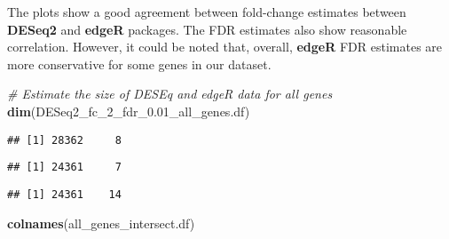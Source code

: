 \documentclass[]{book}
\newenvironment{Shaded}{\begin{snugshade}}{\end{snugshade}}
\newcommand{\KeywordTok}[1]{\textcolor[rgb]{0.13,0.29,0.53}{\textbf{#1}}}
\newcommand{\DataTypeTok}[1]{\textcolor[rgb]{0.13,0.29,0.53}{#1}}
\newcommand{\FloatTok}[1]{\textcolor[rgb]{0.00,0.00,0.81}{#1}}
\newcommand{\StringTok}[1]{\textcolor[rgb]{0.31,0.60,0.02}{#1}}
\newcommand{\CommentTok}[1]{\textcolor[rgb]{0.56,0.35,0.01}{\textit{#1}}}
\newcommand{\OperatorTok}[1]{\textcolor[rgb]{0.81,0.36,0.00}{\textbf{#1}}}
\newcommand{\NormalTok}[1]{#1}
\begin{document}
The plots show a good agreement between fold-change estimates between
\textbf{DESeq2} and \textbf{edgeR} packages. The FDR estimates also show
reasonable correlation. However, it could be noted that, overall,
\textbf{edgeR} FDR estimates are more conservative for some genes in our
dataset.

\begin{Shaded}
\begin{Highlighting}[]
\CommentTok{# Estimate the size of DESEq and edgeR data for all genes}
\KeywordTok{dim}\NormalTok{(DESeq2_fc_2_fdr_}\FloatTok{0.}\NormalTok{01_all_genes.df)}
\end{Highlighting}
\end{Shaded}

\begin{verbatim}
## [1] 28362     8
\end{verbatim}

\begin{Shaded}
\end{Shaded}

\begin{verbatim}
## [1] 24361     7
\end{verbatim}

\begin{Shaded}
\end{Shaded}

\begin{verbatim}
## [1] 24361    14
\end{verbatim}

\begin{Shaded}
\begin{Highlighting}[]
\KeywordTok{colnames}\NormalTok{(all_genes_intersect.df)}
\end{Highlighting}
\end{Shaded}
\end{document}
